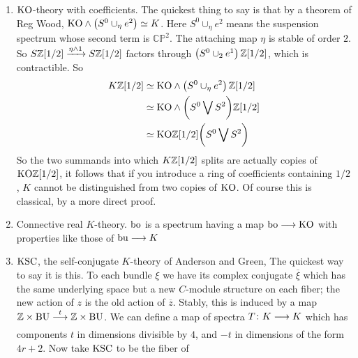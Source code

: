 \documentclass[../main]{subfiles}
\begin{document}
\begin{enumerate}[label = (\roman*)]
    The corresponding homology and cohomology theories are real $K$-homology and real $K$-cohomology. In fact (as for the complex case) for a finite-dimensional CW-complex $X$, $[X,\bZ\times \te{BO}]$ agrees with the Atiyah-Hirzebruch definition of $\te{KO}(X)$ or $\widetilde{\te{KO}}(X)$ in terms of real vector-bundles over $X$. So our definition of $\mathrm{KO}^\ast(X)$ agrees with Atiyah and Hirzebruch if $X$ is a finite-dimensional CW-complex.
    
    The coefficient groups are given by the Bott periodicity theorem:
    \[\ialign{$\hfil#$&\quad$#$&&\quad$#$\hfil\cr
    n&\equiv&0&1&2&3&4&5&6&7&8&\pmod 8\cr
    \pi_n(\te{KO})&=&\bZ&\bZ_2&\bZ_2&0&\bZ&0&0&0&\bZ.\cr}\]
    
    \item $\mathrm{KO}$-theory with coefficients. The quickest thing to say is that by a theorem of Reg Wood, $\mathrm{KO}\wedge \left( S^0\cup_\eta e^2 \right) \simeq K$. Here $S^0\cup_\eta e^2$ means the suspension spectrum whose second term is $\mathbb{CP}^2$. The attaching map $\eta$ is stable of order $2$. So $S\bZ[1/2]\vra{\eta\wedge 1}S\bZ[1/2]$ factors through $\left( S^0\cup_2e^1 \right) \mathbb{Z}[1/2]$, which is contractible. So
    \begin{align}
        K\mathbb{Z}[1/2] &\simeq \mathrm{KO}\wedge \left( S^0\cup_\eta e^2 \right) \mathbb{Z}[1/2] \nonumber \\
        &\simeq \mathrm{KO} \wedge \bigg( S^0\bigvee S^2 \bigg) \mathbb{Z}[1/2] \nonumber \\
        &\simeq \mathrm{KO}\mathbb{Z}[1/2]\bigg( S^0\bigvee S^2 \bigg) \nonumber
    \end{align}
    So the two summands into which $K\mathbb{Z}[1/2]$ splits are actually copies of $\mathrm{KO}\mathbb{Z}[1/2]$, it follows that if you introduce a ring of coefficients containing $1/2$, $K$ cannot be distinguished from two copies of $\mathrm{KO}$. Of course this is classical, by a more direct proof.
    \item Connective real $K$-theory. $\mathrm{bo}$  is a spectrum having a map $\mathrm{bo}\longrightarrow \mathrm{KO}$ with properties like those of $\mathrm{bu}\longrightarrow K$
    \item $\mathrm{KSC}$, the self-conjugate $K$-theory  of Anderson and Green, The quickest way to say it is this. To each bundle $\xi$ we have its complex conjugate $\overline{\xi}$ which has the same underlying space but a new $C$-module structure on each fiber; the new action of $z$ is the old action of $\overline{z}$. Stably, this is induced by a map $\bZ \times \te{BU} \vra{t} \bZ \times \te{BU}$. We can define a map of spectra $T\colon K\longrightarrow K$ which has components $t$ in dimensions divisible by $4$, and $-t$ in dimensions of the form $4r+2$. Now take $\mathrm{KSC}$ to be the fiber of

\end{enumerate}
\end{document}
